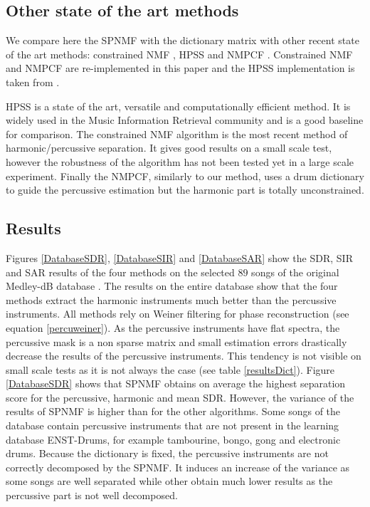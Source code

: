 \documentclass[journal]{IEEEtran}
\begin{document}
\subsection{Other state of the art methods}\label{soth}

We compare here the SPNMF with the dictionary matrix with other recent state of the art methods: constrained NMF \cite{canadas2014percussive}, HPSS \cite{fitzgerald2010harmonic} and NMPCF \cite{kim2011nonnegative}. Constrained NMF and NMPCF are re-implemented in this paper and the HPSS implementation is taken from \cite{DriedgerMueller14_TSMToolbox_DAFX}.

HPSS is a state of the art, versatile and computationally efficient method. It is widely used in the Music Information Retrieval community and is a good baseline for comparison. The constrained NMF algorithm is the most recent method of harmonic/percussive separation. It gives good results on a small scale test, however the robustness of the algorithm has not been tested yet in a large scale experiment. Finally the NMPCF, similarly to our method, uses a drum dictionary to guide the percussive estimation but the harmonic part is totally unconstrained. 


\subsection{Results} \label{subResults}

Figures \ref{DatabaseSDR}, \ref{DatabaseSIR} and \ref{DatabaseSAR} show the SDR, SIR and SAR results of the four methods on the selected $89$ songs of the original Medley-dB database \cite{bittner2014medleydb}. The results on the entire database show that the four methods extract the harmonic instruments much better than the percussive instruments. All methods rely on Weiner filtering for phase reconstruction (see equation \ref{percuweiner}). As the percussive instruments have flat spectra, the percussive mask is a non sparse matrix and small estimation errors drastically decrease the results of the percussive instruments. This tendency is not visible on small scale tests as it is not always the case (see table \ref{resultsDict}). 
Figure \ref{DatabaseSDR} shows that SPNMF obtains on average the highest separation score for the percussive, harmonic and mean SDR. However, the variance of the results of SPNMF is higher than for the other algorithms. Some songs of the database contain percussive instruments that are not present in the learning database ENST-Drums, for example tambourine, bongo, gong and electronic drums. Because the dictionary is fixed, the percussive instruments are not correctly decomposed by the SPNMF. It induces an increase of the variance as some songs are well separated while other obtain much lower results as the percussive part is not well decomposed.
\end{document}
